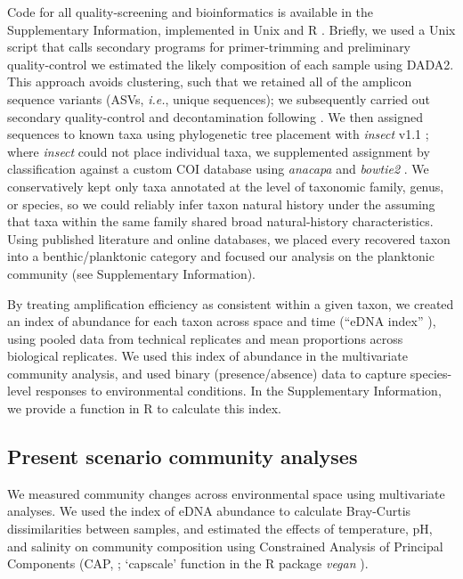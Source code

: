 \documentclass[11pt]{article}
\begin{document}
\begin{linenumbers}
Code for all quality-screening and bioinformatics is available in the Supplementary Information, implemented in Unix and R \cite{r_core_development_team_r:_2013}. Briefly, we used a Unix script that calls secondary programs for primer-trimming and preliminary quality-control \cite{martin2011cutadapt, Callahan:2016aa} we estimated the likely composition of each sample using DADA2. This approach avoids clustering, such that we retained all of the amplicon sequence variants (ASVs, \textit{i.e.}, unique sequences); we subsequently carried out secondary quality-control and decontamination following \cite{kelly2018tides}. We then assigned sequences to known taxa using phylogenetic tree placement with \textit{insect} v1.1 \cite{insect}; where \textit{insect} could not place individual taxa, we supplemented assignment by classification against a custom COI database using \textit{anacapa} \cite{curd2019anacapa} and \textit{bowtie2} \cite{langmead2012fast}. We conservatively kept only taxa annotated at the level of taxonomic family, genus, or species, so we could reliably infer taxon natural history under the assuming that taxa within the same family shared broad natural-history characteristics. Using published literature and online databases, we placed every recovered taxon into a benthic/planktonic category and focused our analysis on the planktonic community (see Supplementary Information).

By treating amplification efficiency as consistent within a given taxon, we created an index of abundance for each taxon across space and time (``eDNA index'' \cite{kelly2019understanding}), using pooled data from technical replicates and mean proportions across biological replicates. We used this index of abundance in the multivariate community analysis, and used binary (presence/absence) data to capture species-level responses to environmental conditions. In the Supplementary Information, we provide a function in R to calculate this index.

\subsection*{Present scenario community analyses}

We measured community changes across environmental space using multivariate analyses. We used the index of eDNA abundance to calculate Bray-Curtis dissimilarities  between samples, and estimated the effects of temperature, pH, and salinity on community composition using Constrained Analysis of Principal Components (CAP, \cite{anderson2003canonical}; `capscale' function in the R package \textit{vegan} \cite{vegan}). 


\end{linenumbers}
\end{document}
